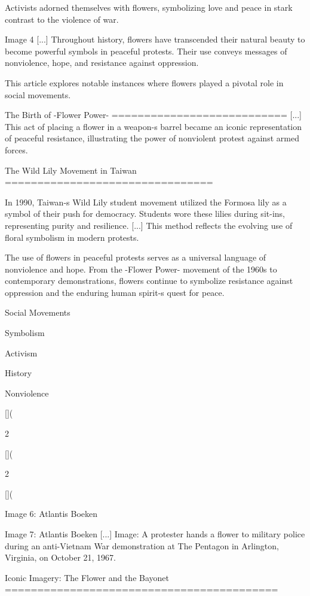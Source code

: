 \documentclass[12pt]{article}
\begin{document}
Activists adorned themselves with flowers, symbolizing love and peace in stark contrast to the violence of war.

Image 4 [...] Throughout history, flowers have transcended their natural beauty to become powerful symbols in peaceful protests. Their use conveys messages of nonviolence, hope, and resistance against oppression.

This article explores notable instances where flowers played a pivotal role in social movements.

The Birth of -Flower Power-
=========================== [...] This act of placing a flower in a weapon-s barrel became an iconic representation of peaceful resistance, illustrating the power of nonviolent protest against armed forces.

The Wild Lily Movement in Taiwan
================================

In 1990, Taiwan-s Wild Lily student movement utilized the Formosa lily as a symbol of their push for democracy. Students wore these lilies during sit-ins, representing purity and resilience. [...] This method reflects the evolving use of floral symbolism in modern protests.

The use of flowers in peaceful protests serves as a universal language of nonviolence and hope. From the -Flower Power- movement of the 1960s to contemporary demonstrations, flowers continue to symbolize resistance against oppression and the enduring human spirit-s quest for peace.

Social Movements

Symbolism

Activism

History

Nonviolence

[](

2

[](

2

[](

Image 6: Atlantis Boeken

Image 7: Atlantis Boeken [...] Image: A protester hands a flower to military police during an anti-Vietnam War demonstration at The Pentagon in Arlington, Virginia, on October 21, 1967.

Iconic Imagery: The Flower and the Bayonet
==========================================
\end{document}
